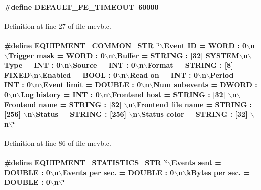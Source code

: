\paragraph[{DEFAULT\_\-FE\_\-TIMEOUT}]{\setlength{\rightskip}{0pt plus 5cm}\#define DEFAULT\_\-FE\_\-TIMEOUT~60000}\hfill\label{mevb_8c_a093e717ef9582e83efcc2550ef0c28cb}


Definition at line 27 of file mevb.c.
\paragraph[{EQUIPMENT\_\-COMMON\_\-STR}]{\setlength{\rightskip}{0pt plus 5cm}\#define EQUIPMENT\_\-COMMON\_\-STR~\char`\"{}$\backslash$Event ID = {\bf WORD} : 0$\backslash$n$\backslash$Trigger mask = {\bf WORD} : 0$\backslash$n$\backslash$Buffer = STRING : \mbox{[}32\mbox{]} SYSTEM$\backslash$n$\backslash$Type = {\bf INT} : 0$\backslash$n$\backslash$Source = {\bf INT} : 0$\backslash$n$\backslash$Format = STRING : \mbox{[}8\mbox{]} FIXED$\backslash$n$\backslash$Enabled = {\bf BOOL} : 0$\backslash$n$\backslash$Read on = {\bf INT} : 0$\backslash$n$\backslash$Period = {\bf INT} : 0$\backslash$n$\backslash$Event limit = DOUBLE : 0$\backslash$n$\backslash$Num subevents = {\bf DWORD} : 0$\backslash$n$\backslash$Log history = {\bf INT} : 0$\backslash$n$\backslash$Frontend host = STRING : \mbox{[}32\mbox{]} $\backslash$n$\backslash$Frontend name = STRING : \mbox{[}32\mbox{]} $\backslash$n$\backslash$Frontend file name = STRING : \mbox{[}256\mbox{]} $\backslash$n$\backslash$Status = STRING : \mbox{[}256\mbox{]} $\backslash$n$\backslash$Status color = STRING : \mbox{[}32\mbox{]} $\backslash$n$\backslash$\char`\"{}}\hfill\label{mevb_8c_ac92b30327caaa939b1b6630775c78ecd}


Definition at line 86 of file mevb.c.
\paragraph[{EQUIPMENT\_\-STATISTICS\_\-STR}]{\setlength{\rightskip}{0pt plus 5cm}\#define EQUIPMENT\_\-STATISTICS\_\-STR~\char`\"{}$\backslash$Events sent = DOUBLE : 0$\backslash$n$\backslash$Events per sec. = DOUBLE : 0$\backslash$n$\backslash$kBytes per sec. = DOUBLE : 0$\backslash$n$\backslash$\char`\"{}}\hfill\label{mevb_8c_a6064db0cc46885d207cedb497e3c355e}


